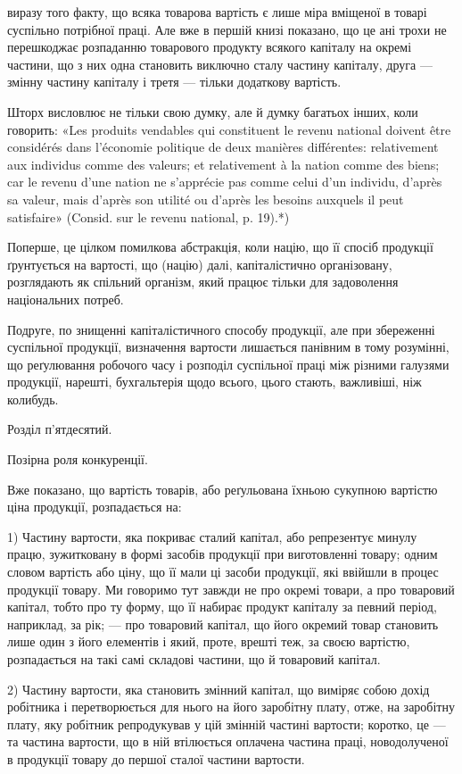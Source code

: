 виразу того факту, що всяка товарова вартість є лише міра вміщеної в товарі
суспільно потрібної праці. Але вже в першій книзі показано, що це ані трохи
не перешкоджає розпаданню товарового продукту всякого капіталу на окремі
частини, що з них одна становить виключно сталу частину капіталу, друга —
змінну частину капіталу і третя — тільки додаткову вартість.

Шторх висловлює не тільки свою думку, але й думку багатьох інших,
коли говорить: «Les produits vendables qui constituent le revenu national doivent
être considérés dans l’économie politique de deux manières différentes: relativement aux
individus comme des valeurs; et relativement à la nation comme des biens; car le
revenu d’une nation ne s’apprécie pas comme celui d’un individu, d’après sa valeur,
mais d’après son utilité ou d’après les besoins auxquels il peut satisfaire» (Consid.
sur le revenu national, p. 19).*)

Поперше, це цілком помилкова абстракція, коли націю, що її спосіб продукції
ґрунтується на вартості, що (націю) далі, капіталістично організовану,
розглядають як спільний організм, який працює тільки для задоволення національних
потреб.

Подруге, по знищенні капіталістичного способу продукції, але при збереженні
суспільної продукції, визначення вартости лишається панівним в тому
розумінні, що реґулювання робочого часу і розподіл суспільної праці між різними
галузями продукції, нарешті, бухгальтерія щодо всього, цього стають,
важливіші, ніж колибудь.

Розділ п’ятдесятий.

Позірна роля конкуренції.

Вже показано, що вартість товарів, або реґульована їхньою сукупною вартістю
ціна продукції, розпадається на:

1) Частину вартости, яка покриває сталий капітал, або репрезентує минулу
працю, зужитковану в формі засобів продукції при виготовленні товару; одним
словом вартість або ціну, що її мали ці засоби продукції, які ввійшли в процес
продукції товару. Ми говоримо тут завжди не про окремі товари, а про товаровий
капітал, тобто про ту форму, що її набирає продукт капіталу за певний
період, наприклад, за рік; — про товаровий капітал, що його окремий товар
становить лише один з його елементів і який, проте, врешті теж, за своєю
вартістю, розпадається на такі самі складові частини, що й товаровий капітал.

2) Частину вартости, яка становить змінний капітал, що виміряє собою
дохід робітника і перетворюється для нього на його заробітну плату, отже, на
заробітну плату, яку робітник репродукував у цій змінній частині вартости;
коротко, це — та частина вартости, що в ній втілюється оплачена частина
праці, новодолученої в продукції товару до першої сталої частини вартости.

